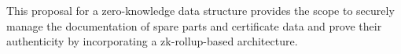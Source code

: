 This proposal for a zero-knowledge data structure provides the scope to securely manage the documentation of spare parts and certificate data and prove their authenticity by incorporating a zk-rollup-based architecture.

